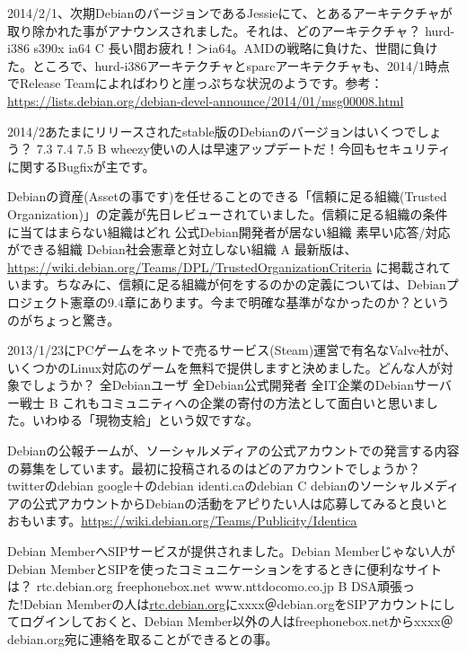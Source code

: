 %

\santaku
{2014/2/1、次期DebianのバージョンであるJessieにて、とあるアーキテクチャが取り除かれた事がアナウンスされました。それは、どのアーキテクチャ？}
{hurd-i386}
{s390x}
{ia64}
{C}
{長い間お疲れ！＞ia64。AMDの戦略に負けた、世間に負けた。ところで、hurd-i386アーキテクチャとsparcアーキテクチャも、2014/1時点でRelease Teamによればわりと崖っぷちな状況のようです。参考：\url{https://lists.debian.org/debian-devel-announce/2014/01/msg00008.html}}

\santaku
{2014/2あたまにリリースされたstable版のDebianのバージョンはいくつでしょう？}
{7.3}
{7.4}
{7.5}
{B}
{wheezy使いの人は早速アップデートだ！今回もセキュリティに関するBugfixが主です。}

\santaku
{Debianの資産(Assetの事です)を任せることのできる「信頼に足る組織(Trusted Organization)」の定義が先日レビューされていました。信頼に足る組織の条件に当てはまらない組織はどれ}
{公式Debian開発者が居ない組織}
{素早い応答/対応ができる組織}
{Debian社会憲章と対立しない組織}
{A}
{最新版は、\url{https://wiki.debian.org/Teams/DPL/TrustedOrganizationCriteria}
に掲載されています。ちなみに、信頼に足る組織が何をするのかの定義については、Debianプロジェクト憲章の9.4章にあります。今まで明確な基準がなかったのか？というのがちょっと驚き。}

\santaku
{2013/1/23にPCゲームをネットで売るサービス(Steam)運営で有名なValve社が、いくつかのLinux対応のゲームを無料で提供しますと決めました。どんな人が対象でしょうか？}
{全Debianユーザ}
{全Debian公式開発者}
{全IT企業のDebianサーバー戦士}
{B}
{これもコミュニティへの企業の寄付の方法として面白いと思いました。いわゆる「現物支給」という奴ですな。}

\santaku
{Debianの公報チームが、ソーシャルメディアの公式アカウントでの発言する内容の募集をしています。最初に投稿されるのはどのアカウントでしょうか？}
{twitterのdebian}
{google＋のdebian}
{identi.caのdebian}
{C}
{debianのソーシャルメディアの公式アカウントからDebianの活動をアピりたい人は応募してみると良いとおもいます。\url{https://wiki.debian.org/Teams/Publicity/Identica}}

\santaku
{Debian MemberへSIPサービスが提供されました。Debian Memberじゃない人がDebian MemberとSIPを使ったコミュニケーションをするときに便利なサイトは？}
{rtc.debian.org}
{freephonebox.net}
{www.nttdocomo.co.jp}
{B}
{DSA頑張った!Debian Memberの人は\url{rtc.debian.org}にxxxx＠debian.orgをSIPアカウントにしてログインしておくと、Debian Member以外の人はfreephonebox.netからxxxx＠debian.org宛に連絡を取ることができるとの事。}


